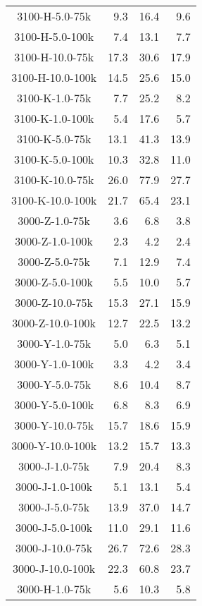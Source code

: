 \begin{longtable}{crrr}
    3100-H-5.0-75k   &    9.3 &   16.4 &    9.6 \\
    3100-H-5.0-100k  &    7.4 &   13.1 &    7.7 \\
    3100-H-10.0-75k  &   17.3 &   30.6 &   17.9 \\
    3100-H-10.0-100k &   14.5 &   25.6 &   15.0 \\
    3100-K-1.0-75k   &    7.7 &   25.2 &    8.2 \\
    3100-K-1.0-100k  &    5.4 &   17.6 &    5.7 \\
    3100-K-5.0-75k   &   13.1 &   41.3 &   13.9 \\
    3100-K-5.0-100k  &   10.3 &   32.8 &   11.0 \\
    3100-K-10.0-75k  &   26.0 &   77.9 &   27.7 \\
    3100-K-10.0-100k &   21.7 &   65.4 &   23.1 \\
    3000-Z-1.0-75k   &    3.6 &    6.8 &    3.8 \\
    3000-Z-1.0-100k  &    2.3 &    4.2 &    2.4 \\
    3000-Z-5.0-75k   &    7.1 &   12.9 &    7.4 \\
    3000-Z-5.0-100k  &    5.5 &   10.0 &    5.7 \\
    3000-Z-10.0-75k  &   15.3 &   27.1 &   15.9 \\
    3000-Z-10.0-100k &   12.7 &   22.5 &   13.2 \\
    3000-Y-1.0-75k   &    5.0 &    6.3 &    5.1 \\
    3000-Y-1.0-100k  &    3.3 &    4.2 &    3.4 \\
    3000-Y-5.0-75k   &    8.6 &   10.4 &    8.7 \\
    3000-Y-5.0-100k  &    6.8 &    8.3 &    6.9 \\
    3000-Y-10.0-75k  &   15.7 &   18.6 &   15.9 \\
    3000-Y-10.0-100k &   13.2 &   15.7 &   13.3 \\
    3000-J-1.0-75k   &    7.9 &   20.4 &    8.3 \\
    3000-J-1.0-100k  &    5.1 &   13.1 &    5.4 \\
    3000-J-5.0-75k   &   13.9 &   37.0 &   14.7 \\
    3000-J-5.0-100k  &   11.0 &   29.1 &   11.6 \\
    3000-J-10.0-75k  &   26.7 &   72.6 &   28.3 \\
    3000-J-10.0-100k &   22.3 &   60.8 &   23.7 \\
    3000-H-1.0-75k   &    5.6 &   10.3 &    5.8 \\

\end{longtable}
